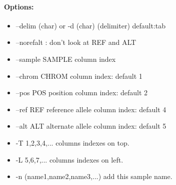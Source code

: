 \documentclass[12pt]{article}
\begin{document}
\paragraph{Options:}
\begin{itemize}
\item--delim (char) or -d  (char) (delimiter) default:tab
\item--norefalt : don't look at REF and ALT
\item--sample SAMPLE column index
\item--chrom CHROM column index: default 1
\item--pos POS position column index: default 2
\item--ref REF reference allele column index: default 4
\item--alt ALT alternate allele column index: default 5
\item-T 1,2,3,4,... columns indexes on top.
\item-L 5,6,7,... columns indexes on left.
\item-n (name1,name2,name3,...) add this sample name.
\end{itemize}
\end{document}
